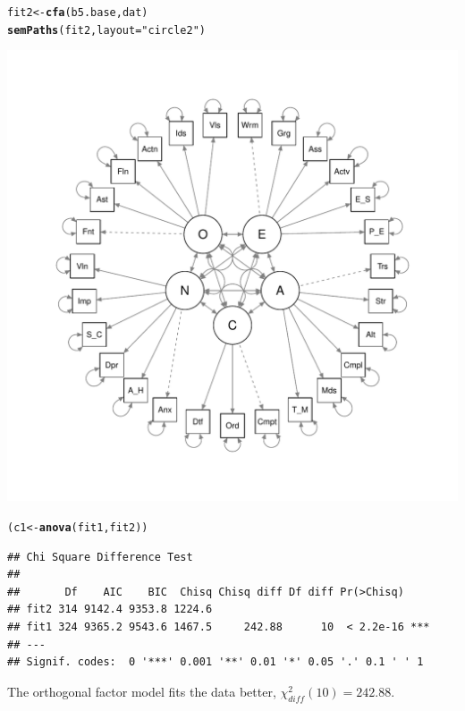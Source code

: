 \documentclass{article}\usepackage[]{graphicx}\usepackage[]{color}
\makeatletter
\def\maxwidth{ %
  \ifdim\Gin@nat@width>\linewidth
    \linewidth
  \else
    \Gin@nat@width
  \fi
}
\newcommand{\hlstr}[1]{\textcolor[rgb]{0.192,0.494,0.8}{#1}}%
\newcommand{\hlstd}[1]{\textcolor[rgb]{0.345,0.345,0.345}{#1}}%
\newcommand{\hlkwb}[1]{\textcolor[rgb]{0.69,0.353,0.396}{#1}}%
\newcommand{\hlkwc}[1]{\textcolor[rgb]{0.333,0.667,0.333}{#1}}%
\newcommand{\hlkwd}[1]{\textcolor[rgb]{0.737,0.353,0.396}{\textbf{#1}}}%
\newenvironment{kframe}{%
 \def\at@end@of@kframe{}%
 \ifinner\ifhmode%
  \def\at@end@of@kframe{\end{minipage}}%
  \begin{minipage}{\columnwidth}%
 \fi\fi%
 \def\FrameCommand##1{\hskip\@totalleftmargin \hskip-\fboxsep
 \colorbox{shadecolor}{##1}\hskip-\fboxsep
     \hskip-\linewidth \hskip-\@totalleftmargin \hskip\columnwidth}%
 \MakeFramed {\advance\hsize-\width
   \@totalleftmargin\z@ \linewidth\hsize
   \@setminipage}}%
 {\par\unskip\endMakeFramed%
 \at@end@of@kframe}
\newenvironment{knitrout}{}{} %
\makeatother
\begin{document}
\begin{knitrout}
\color{fgcolor}\begin{kframe}
\begin{alltt}
\hlstd{fit2} \hlkwb{<-} \hlkwd{cfa}\hlstd{(b5.base, dat)}
\hlkwd{semPaths}\hlstd{(fit2,} \hlkwc{layout} \hlstd{=} \hlstr{"circle2"}\hlstd{)}
\end{alltt}
\end{kframe}
\includegraphics[width=\maxwidth]{figure/unnamed-chunk-6-1} 
\begin{kframe}\begin{alltt}
\hlstd{(c1} \hlkwb{<-} \hlkwd{anova}\hlstd{(fit1, fit2))}
\end{alltt}
\begin{verbatim}
## Chi Square Difference Test
## 
##       Df    AIC    BIC  Chisq Chisq diff Df diff Pr(>Chisq)    
## fit2 314 9142.4 9353.8 1224.6                                  
## fit1 324 9365.2 9543.6 1467.5     242.88      10  < 2.2e-16 ***
## ---
## Signif. codes:  0 '***' 0.001 '**' 0.01 '*' 0.05 '.' 0.1 ' ' 1
\end{verbatim}
\end{kframe}
\end{knitrout}

The orthogonal factor model fits the data better, $\chi^2_{diff}(10) = 242.88$. 
\end{document}
